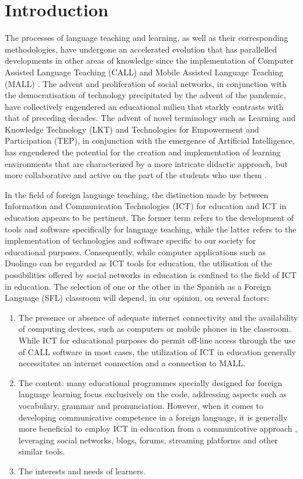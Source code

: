 \documentclass[english]{textolivre}
\begin{document}
\section{Introduction}
The processes of language teaching and learning, as well as their corresponding methodologies, have undergone an accelerated evolution that has parallelled developments in other areas of knowledge since the implementation of Computer Assisted Language Teaching (CALL) and Mobile Assisted Language Teaching (MALL) \cite{gabarron-perez2020}. The advent and proliferation of social networks, in conjunction with the democratisation of technology precipitated by the advent of the pandemic, have collectively engendered an educational milieu that starkly contrasts with that of preceding decades. The advent of novel terminology such as Learning and Knowledge Technology (LKT) and Technologies for Empowerment and Participation (TEP), in conjunction with the emergence of Artificial Intelligence, has engendered the potential for the creation and implementation of learning environments that are characterized by a more intricate didactic approach, but more collaborative and active on the part of the students who use them \cite{gutierrez2022}.

In the field of foreign language teaching, the distinction made by \textcite{coello-munoz2023} between Information and Communication Technologies (ICT) for education and ICT in education appears to be pertinent. The former term refers to the development of tools and software specifically for language teaching, while the latter refers to the implementation of technologies and software specific to our society for educational purposes. Consequently, while computer applications such as Duolingo can be regarded as ICT tools for education, the utilisation of the possibilities offered by social networks in education is confined to the field of ICT in education. The selection of one or the other in the Spanish as a Foreign Language (SFL) classroom will depend, in our opinion, on several factors:
\begin{enumerate}[label=\alph*)]
    \item The presence or absence of adequate internet connectivity and the availability of computing devices, such as computers or mobile phones in the classroom. While ICT for educational purposes do permit off-line access through the use of CALL software in most cases, the utilization of ICT in education generally necessitates an internet connection and a connection to MALL.

    \item The content: many educational programmes specially designed for foreign language learning focus exclusively on the code, addressing aspects such as vocabulary, grammar and pronunciation. However, when it comes to developing communicative competence in a foreign language, it is generally more beneficial to employ ICT in education from a communicative approach \cite{badia-climent2024}, leveraging social networks, blogs, forums, streaming platforms and other similar tools.

    \item The interests and needs of learners.
\end{enumerate}
\end{document}
